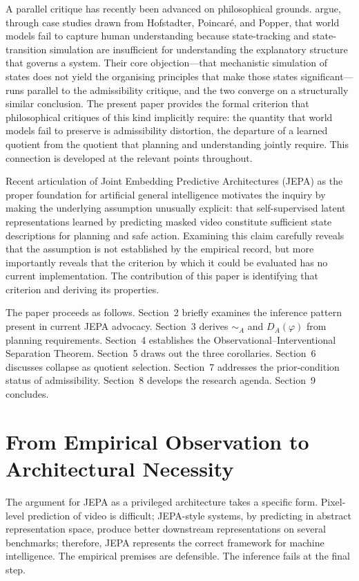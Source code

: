 \documentclass[11pt, a4paper]{article}
\theoremstyle{plain}
\theoremstyle{definition}
\theoremstyle{remark}
\newcommand{\simA}{\sim_A}
\newcommand{\DA}{D_A(\varphi)}
\begin{document}
A parallel critique has recently been advanced on philosophical grounds.
\citet{gupta2025world} argue, through case studies drawn from Hofstadter, Poincar\'e,
and Popper, that world models fail to capture human understanding because
state-tracking and state-transition simulation are insufficient for understanding
the explanatory structure that governs a system. Their core objection---that
mechanistic simulation of states does not yield the organising principles that
make those states significant---runs parallel to the admissibility critique, and
the two converge on a structurally similar conclusion. The present paper provides
the formal criterion that philosophical critiques of this kind implicitly require:
the quantity that world models fail to preserve is admissibility distortion, the
departure of a learned quotient from the quotient that planning and understanding
jointly require. This connection is developed at the relevant points throughout.

Recent articulation of Joint Embedding Predictive Architectures (JEPA) as the
proper foundation for artificial general intelligence motivates the inquiry by
making the underlying assumption unusually explicit: that self-supervised latent
representations learned by predicting masked video constitute sufficient state
descriptions for planning and safe action. Examining this claim carefully reveals
that the assumption is not established by the empirical record, but more
importantly reveals that the criterion by which it could be evaluated has no
current implementation. The contribution of this paper is identifying that
criterion and deriving its properties.

The paper proceeds as follows. Section~2 briefly examines the inference pattern
present in current JEPA advocacy. Section~3 derives $\simA$ and $\DA$ from
planning requirements. Section~4 establishes the Observational--Interventional
Separation Theorem. Section~5 draws out the three corollaries. Section~6 discusses
collapse as quotient selection. Section~7 addresses the prior-condition status
of admissibility. Section~8 develops the research agenda. Section~9 concludes.

\section{From Empirical Observation to Architectural Necessity}

The argument for JEPA as a privileged architecture takes a specific form. Pixel-level
prediction of video is difficult; JEPA-style systems, by predicting in abstract
representation space, produce better downstream representations on several
benchmarks; therefore, JEPA represents the correct framework for machine
intelligence. The empirical premises are defensible. The inference fails at the
final step.
\end{document}
